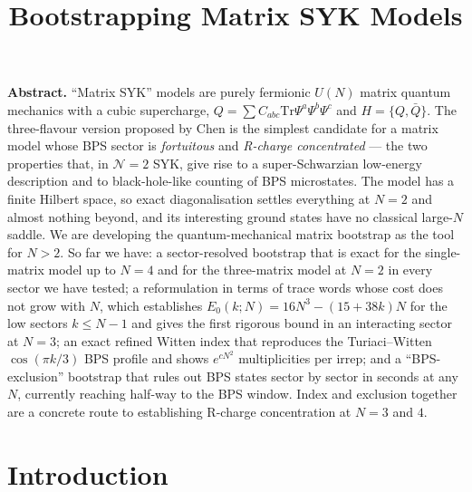 \documentclass[10pt]{article}
\title{\vspace{-1.6cm}\Large\textbf{Bootstrapping Matrix SYK Models}\vspace{-4pt}}
\author{}
\date{}
\newcommand{\Tr}{\mathrm{Tr}}
\newcommand{\bQ}{\bar Q}
\begin{document}
\maketitle
\vspace{-1.1cm}
\begin{center}\begin{minipage}{0.97\textwidth}\small
\textbf{Abstract.} ``Matrix SYK'' models are purely fermionic $U(N)$ matrix quantum mechanics with a cubic supercharge, $Q=\sum C_{abc}\Tr\Psi^a\Psi^b\Psi^c$ and $H=\{Q,\bQ\}$. The three-flavour version proposed by Chen is the simplest candidate for a matrix model whose BPS sector is \emph{fortuitous} and \emph{R-charge concentrated} --- the two properties that, in $\mathcal N=2$ SYK, give rise to a super-Schwarzian low-energy description and to black-hole-like counting of BPS microstates. The model has a finite Hilbert space, so exact diagonalisation settles everything at $N=2$ and almost nothing beyond, and its interesting ground states have no classical large-$N$ saddle. We are developing the quantum-mechanical matrix bootstrap as the tool for $N>2$. So far we have: a sector-resolved bootstrap that is exact for the single-matrix model up to $N=4$ and for the three-matrix model at $N=2$ in every sector we have tested; a reformulation in terms of trace words whose cost does not grow with $N$, which establishes $E_0(k;N)=16N^3-(15+38k)N$ for the low sectors $k\le N-1$ and gives the first rigorous bound in an interacting sector at $N=3$; an exact refined Witten index that reproduces the Turiaci--Witten $\cos(\pi k/3)$ BPS profile and shows $e^{cN^2}$ multiplicities per irrep; and a ``BPS-exclusion'' bootstrap that rules out BPS states sector by sector in seconds at any $N$, currently reaching half-way to the BPS window. Index and exclusion together are a concrete route to establishing R-charge concentration at $N=3$ and $4$.
\end{minipage}\end{center}
\vspace{10pt}

\section{Introduction}
\end{document}
